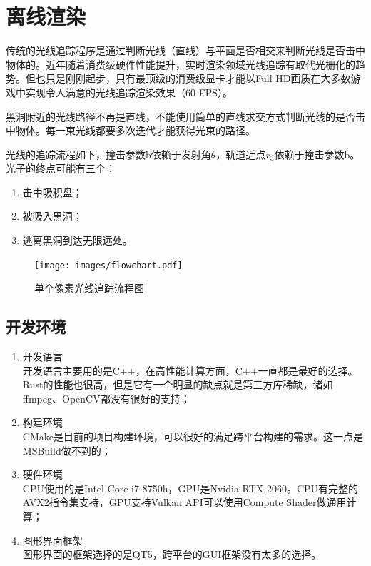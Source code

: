 \section{离线渲染}
传统的光线追踪程序是通过判断光线（直线）与平面是否相交来判断光线是否击中物体的。近年随着消费级硬件性能提升，实时渲染领域光线追踪有取代光栅化的趋势。但也只是刚刚起步，只有最顶级的消费级显卡才能以Full HD画质在大多数游戏中实现令人满意的光线追踪渲染效果（60 FPS）。

黑洞附近的光线路径不再是直线，不能使用简单的直线求交方式判断光线的是否击中物体。每一束光线都要多次迭代才能获得光束的路径。

光线的追踪流程如下，撞击参数b依赖于发射角$\theta$，轨道近点$r_3$依赖于撞击参数b。光子的终点可能有三个：
\begin{enumerate}
    \item 击中吸积盘；
    \item 被吸入黑洞；
    \item 逃离黑洞到达无限远处。
\end{enumerate}
\begin{figure}[H]
    \centering
    \texttt{[image: images/flowchart.pdf]}
    \caption{单个像素光线追踪流程图}\label{fig:flowchart} %
\end{figure}

\subsection{开发环境}
\begin{enumerate}
    \item 开发语言 \\ 开发语言主要用的是C++，在高性能计算方面，C++一直都是最好的选择。Rust的性能也很高，但是它有一个明显的缺点就是第三方库稀缺，诸如ffmpeg、OpenCV都没有很好的支持；
    \item 构建环境 \\ CMake是目前的项目构建环境，可以很好的满足跨平台构建的需求。这一点是MSBuild做不到的；
    \item 硬件环境 \\ CPU使用的是Intel Core i7-8750h，GPU是Nvidia RTX-2060。CPU有完整的AVX2指令集支持，GPU支持Vulkan API可以使用Compute Shader做通用计算；
    \item 图形界面框架 \\ 图形界面的框架选择的是QT5，跨平台的GUI框架没有太多的选择。
\end{enumerate}


